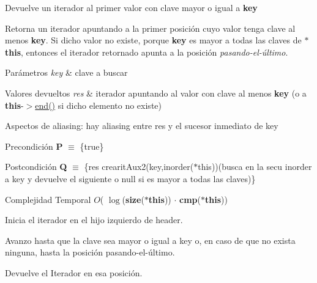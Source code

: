 Devuelve un iterador al primer valor con clave mayor o igual a {\bfseries key} 

Retorna un iterador apuntando a la primer posición cuyo valor tenga clave al menos {\bfseries key}. Si dicho valor no existe, porque {\bfseries key} es mayor a todas las claves de {\bfseries $\ast$this}, entonces el iterador retornado apunta a la posición {\itshape pasando-\/el-\/último}.


\begin{DoxyParams}{Parámetros}
{\em key} & clave a buscar \\
\hline
\end{DoxyParams}

\begin{DoxyRetVals}{Valores devueltos}
{\em res} & iterador apuntando al valor con clave al menos {\bfseries key} (o a {\bfseries this}-\/$>$\hyperlink{classaed2_1_1iterator_a67caf9468be999e9be96b7add5d79946_a67caf9468be999e9be96b7add5d79946}{end()} si dicho elemento no existe)\\
\hline
\end{DoxyRetVals}
\begin{DoxyParagraph}{Aspectos de aliasing\+:}
hay aliasing entre res y el sucesor inmediato de key
\end{DoxyParagraph}
\begin{DoxyPrecond}{Precondición}
{\bfseries P} $\equiv$ \{true\} 
\end{DoxyPrecond}
\begin{DoxyPostcond}{Postcondición}
{\bfseries Q} $\equiv$ \{res  crearit\+Aux2(key,inorder($\ast$this))(busca en la secu inorder a key y devuelve el siguiente o null si es mayor a todas las claves)\}
\end{DoxyPostcond}

\begin{DoxyDescription}
\item[Complejidad Temporal]$O$( $\log$({\bfseries size}({\bfseries $\ast$this})) $\cdot$ {\bfseries cmp}({\bfseries $\ast$this}))
\end{DoxyDescription}
\begin{DoxyItemize}
\item Inicia el iterador en el hijo izquierdo de header.
\item Avanzo hasta que la clave sea mayor o igual a key o, en caso de que no exista ninguna, hasta la posición pasando-\/el-\/último.
\item Devuelve el Iterador en esa posición. 
\end{DoxyItemize}

